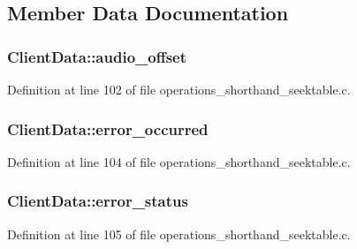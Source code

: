 \subsection{Member Data Documentation}
\subsubsection[{\texorpdfstring{audio\+\_\+offset}{audio_offset}}]{ Client\+Data\+::audio\+\_\+offset}\hypertarget{struct_client_data_ac451421a53f048c1de1f8779747bc6bd}{}\label{struct_client_data_ac451421a53f048c1de1f8779747bc6bd}


Definition at line 102 of file operations\+\_\+shorthand\+\_\+seektable.\+c.

\subsubsection[{\texorpdfstring{error\+\_\+occurred}{error_occurred}}]{ Client\+Data\+::error\+\_\+occurred}\hypertarget{struct_client_data_a49bb3cfefdccec2c7212ad4d378bbe4f}{}\label{struct_client_data_a49bb3cfefdccec2c7212ad4d378bbe4f}


Definition at line 104 of file operations\+\_\+shorthand\+\_\+seektable.\+c.

\subsubsection[{\texorpdfstring{error\+\_\+status}{error_status}}]{ Client\+Data\+::error\+\_\+status}\hypertarget{struct_client_data_a10b0781f69413999ab5af69f88927205}{}\label{struct_client_data_a10b0781f69413999ab5af69f88927205}


Definition at line 105 of file operations\+\_\+shorthand\+\_\+seektable.\+c.

